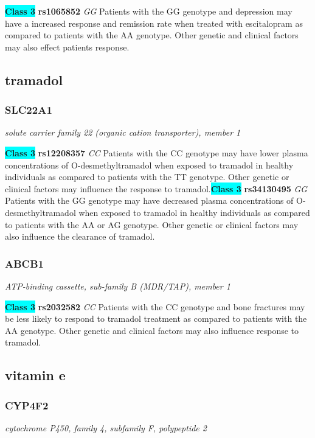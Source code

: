 \documentclass{report}
\begin{document}
\textbf{\colorbox{cyan} {Class 3}} \textbf{ rs1065852 } \textit{ GG }
Patients with the GG genotype and depression may have a increased response and remission rate when treated with escitalopram as compared to patients with the AA genotype. Other genetic and clinical factors may also effect patients response.\newline\subsection{ tramadol }\subsubsection{ SLC22A1 }
\textit{ solute carrier family 22 (organic cation transporter), member 1 }

\textbf{\colorbox{cyan} {Class 3}} \textbf{ rs12208357 } \textit{ CC }
Patients with the CC genotype may have lower plasma concentrations of O-desmethyltramadol when exposed to tramadol in healthy individuals as compared to patients with the TT genotype. Other genetic or clinical factors may influence the response to tramadol.\newline\textbf{\colorbox{cyan} {Class 3}} \textbf{ rs34130495 } \textit{ GG }
Patients with the GG genotype may have decreased plasma concentrations of O-desmethyltramadol when exposed to tramadol in healthy individuals as compared to patients with the AA or AG genotype. Other genetic or clinical factors may also influence the clearance of tramadol.\newline\subsubsection{ ABCB1 }
\textit{ ATP-binding cassette, sub-family B (MDR/TAP), member 1 }

\textbf{\colorbox{cyan} {Class 3}} \textbf{ rs2032582 } \textit{ CC }
Patients with the CC genotype and bone fractures may be less likely to respond to tramadol treatment as compared to patients with the AA genotype. Other genetic and clinical factors may also influence response to tramadol. \newline\subsection{ vitamin e }\subsubsection{ CYP4F2 }
\textit{ cytochrome P450, family 4, subfamily F, polypeptide 2 }
\end{document}
